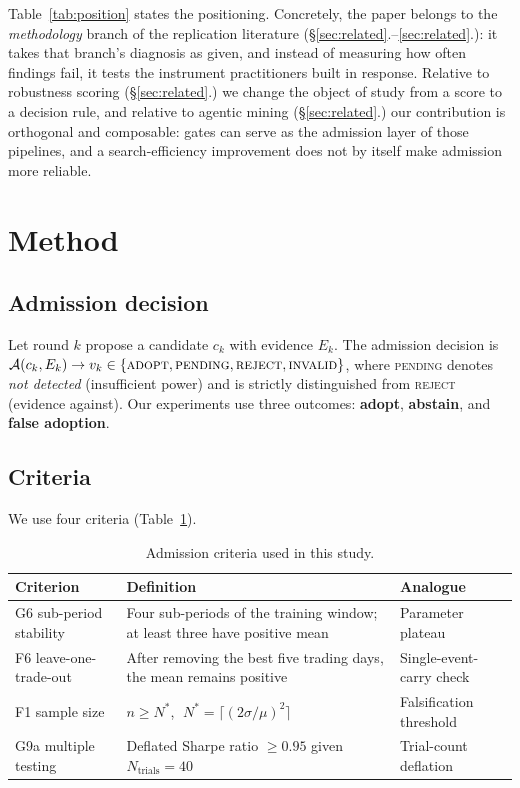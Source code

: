 \documentclass[11pt]{article}
\begin{document}
Table~\ref{tab:position} states the positioning. Concretely, the paper belongs to the
\emph{methodology} branch of the replication literature (\S\ref{sec:related}.--\ref{sec:related}.):
it takes that branch's diagnosis as given, and instead of measuring how often findings fail,
it tests the instrument practitioners built in response. Relative to robustness scoring
(\S\ref{sec:related}.) we change the object of study from a score to a decision rule, and
relative to agentic mining (\S\ref{sec:related}.) our contribution is orthogonal and
composable: gates can serve as the admission layer of those pipelines, and a search-efficiency
improvement does not by itself make admission more reliable.

\section{Method}
\label{sec:method}

\subsection{Admission decision}

Let round $k$ propose a candidate $c_k$ with evidence $E_k$. The admission decision is
$\mathcal{A}(c_k,E_k)\to v_k\in\{\textsc{adopt},\textsc{pending},\textsc{reject},
\textsc{invalid}\}$, where \textsc{pending} denotes \emph{not detected} (insufficient power) and
is strictly distinguished from \textsc{reject} (evidence against). Our experiments use three
outcomes: \textbf{adopt}, \textbf{abstain}, and \textbf{false adoption}.

\subsection{Criteria}

We use four criteria (Table~\ref{tab:criteria}).

\begin{table}[htbp]
\centering
\caption{Admission criteria used in this study.}
\label{tab:criteria}
\small
\begin{tabular}{@{}p{3.0cm}p{8.2cm}p{2.6cm}@{}}
\toprule
\textbf{Criterion} & \textbf{Definition} & \textbf{Analogue} \\
\midrule
G6 sub-period stability & Four sub-periods of the training window; at least three have positive mean &
Parameter plateau \\
F6 leave-one-trade-out & After removing the best five trading days, the mean remains positive &
Single-event-carry check \\
F1 sample size & $n \geq N^{*}$, $\;N^{*}=\lceil (2\sigma/\mu)^2\rceil$ & Falsification threshold \\
G9a multiple testing & Deflated Sharpe ratio $\geq0.95$ given $N_{\text{trials}}=40$ & Trial-count deflation \citep{dsr} \\
\bottomrule
\end{tabular}
\end{table}
\end{document}
